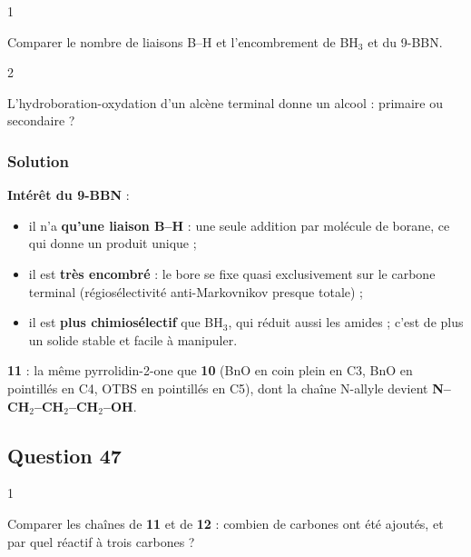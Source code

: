 \documentclass[11pt,a4paper]{article}
\providecommand{\tightlist}{\setlength{\itemsep}{0pt}\setlength{\parskip}{0pt}}
\begin{document}
\begin{indication}{1}

Comparer le nombre de liaisons B--H et l'encombrement de BH\(_3\) et du 9-BBN.

\end{indication}

\begin{indication}{2}

L'hydroboration-\allowbreak{}oxydation d'un alcène terminal donne un alcool : primaire ou secondaire ?

\end{indication}

\hypertarget{solution-45}{%
\subsubsection{Solution}\label{solution-45}}

\textbf{Intérêt du 9-BBN} :

\begin{itemize}
\tightlist
\item
  il n'a \textbf{qu'une liaison B--H} : une seule addition par molécule de borane, ce qui donne un produit unique ;
\item
  il est \textbf{très encombré} : le bore se fixe quasi exclusivement sur le carbone terminal (régiosélectivité anti-Markovnikov presque totale) ;
\item
  il est \textbf{plus chimiosélectif} que BH\(_3\), qui réduit aussi les amides ; c'est de plus un solide stable et facile à manipuler.
\end{itemize}

\textbf{11} : la même pyrrolidin-2-one que \textbf{10} (BnO en coin plein en C3, BnO en pointillés en C4, OTBS en pointillés en C5), dont la chaîne N-allyle devient \textbf{N--CH\(_2\)--CH\(_2\)--CH\(_2\)--OH}.

\hypertarget{question-47}{%
\subsection{Question 47}\label{question-47}}

\begin{indication}{1}

Comparer les chaînes de \textbf{11} et de \textbf{12} : combien de carbones ont été ajoutés, et par quel réactif à trois carbones ?

\end{indication}
\end{document}
